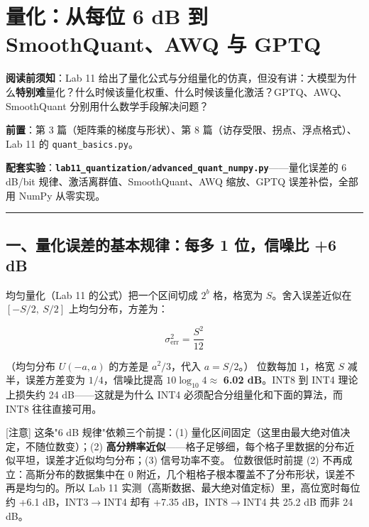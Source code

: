 \chapter{量化：从每位 6 dB 到 SmoothQuant、AWQ 与 GPTQ}

\begin{mathBox}[核心数学定理推导]
\textbf{阅读前须知}：Lab 11 给出了量化公式与分组量化的仿真，但没有讲：大模型为什么\textbf{特别难}量化？什么时候该量化权重、什么时候该量化激活？GPTQ、AWQ、SmoothQuant 分别用什么数学手段解决问题？

\textbf{前置}：第 3 篇（矩阵乘的梯度与形状）、第 8 篇（访存受限、拐点、浮点格式）、Lab 11 的 \texttt{quant\_basics.py}。

\textbf{配套实验}：\textbf{\texttt{lab11\_quantization/advanced\_quant\_numpy.py}}——量化误差的 6 dB/bit 规律、激活离群值、SmoothQuant、AWQ 缩放、GPTQ 误差补偿，全部用 NumPy 从零实现。
\end{mathBox}

\vspace{0.8em}\hrule\vspace{0.8em}

\section{一、量化误差的基本规律：每多 1 位，信噪比 +6 dB}

均匀量化（Lab 11 的公式）把一个区间切成 $2^b$ 格，格宽为 $S$。舍入误差近似在 $[-S/2, \ S/2]$ 上均匀分布，方差为：

\[
\sigma_{\text{err}}^2 = \frac{S^2}{12}
\]

（均匀分布 $U(-a, a)$ 的方差是 $a^2/3$，代入 $a = S/2$。）
位数每加 1，格宽 $S$ 减半，误差方差变为 $1/4$，信噪比提高 $10 \log_{10} 4 \approx$ \textbf{6.02 dB}。INT8 到 INT4 理论上损失约 24 dB——这就是为什么 INT4 必须配合分组量化和下面的算法，而 INT8 往往直接可用。

\begin{warningBox}[避坑指南与核心警示]
{}[注意] 这条"6 dB 规律"依赖三个前提：(1) 量化区间固定（这里由最大绝对值决定，不随位数变）；(2) \textbf{高分辨率近似}——格子足够细，每个格子里数据的分布近似平坦，误差才近似均匀分布；(3) 信号功率不变。
位数很低时前提 (2) 不再成立：高斯分布的数据集中在 0 附近，几个粗格子根本覆盖不了分布形状，误差不再是均匀的。所以 Lab 11 实测（高斯数据、最大绝对值定标）里，高位宽时每位约 +6.1 dB，INT3$\rightarrow$INT4 却有 +7.35 dB，INT8$\rightarrow$INT4 共 25.2 dB 而非 24 dB。
\end{warningBox}

